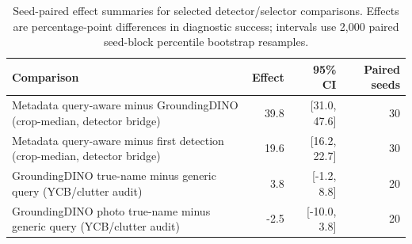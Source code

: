 \begin{table}[t]
\centering
\caption{Seed-paired effect summaries for selected detector/selector comparisons. Effects are percentage-point differences in diagnostic success; intervals use 2,000 paired seed-block percentile bootstrap resamples.}
\label{tab:paired-effects-scirep}
\footnotesize
\begin{tabular}{lrrr}
\toprule
Comparison & Effect & 95\% CI & Paired seeds \\
\midrule
Metadata query-aware minus GroundingDINO (crop-median, detector bridge) & 39.8 & [31.0, 47.6] & 30 \\
Metadata query-aware minus first detection (crop-median, detector bridge) & 19.6 & [16.2, 22.7] & 30 \\
GroundingDINO true-name minus generic query (YCB/clutter audit) & 3.8 & [-1.2, 8.8] & 20 \\
GroundingDINO photo true-name minus generic query (YCB/clutter audit) & -2.5 & [-10.0, 3.8] & 20 \\
\bottomrule
\end{tabular}
\end{table}

